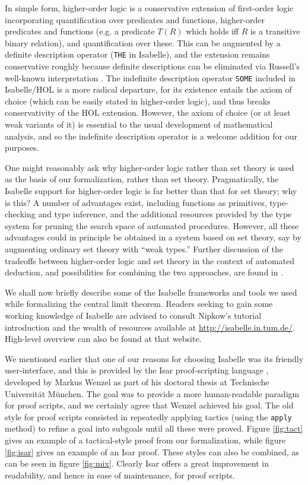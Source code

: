 \documentclass{article}
\theoremstyle{definition}
\begin{document}
In simple form, higher-order logic is a conservative extension of first-order logic incorporating quantification over predicates and functions, higher-order predicates and functions (e.g. a predicate $T(R)$ which holds iff $R$ is a transitive binary relation), and quantification over these. This can be augmented by a definite description operator (\texttt{THE} in Isabelle), and the extension remains conservative roughly because definite descriptions can be eliminated via Russell's well-known interpretation \cite{russell-knowledge-acquaintance-description}. The indefinite description operator \texttt{SOME} included in Isabelle/HOL is a more radical departure, for its existence entails the axiom of choice (which can be easily stated in higher-order logic), and thus breaks conservativity of the HOL extension. However, the axiom of choice (or at least weak variants of it) is essential to the usual development of mathematical analysis, and so the indefinite description operator is a welcome addition for our purposes.

One might reasonably ask why higher-order logic rather than set theory is used as the basis of our formalization, rather than set theory. Pragmatically, the Isabelle support for higher-order logic is far better than that for set theory; why is this? A number of advantages exist, including functions as primitives, type-checking and type inference, and the additional resources provided by the type system for pruning the search space of automated procedures. However, all these advantages could in principle be obtained in a system based on set theory, say by augmenting ordinary set theory with ``weak types.'' Further discussion of the tradeoffs between higher-order logic and set theory in the context of automated deduction, and possibilities for combining the two approaches, are found in \cite{gordon-hol-set}.

We shall now briefly describe some of the Isabelle frameworks and tools we used while formalizing the central limit theorem. Readers seeking to gain some working knowledge of Isabelle are advised to consult Nipkow's tutorial introduction \cite{nipkow-prog-prove} and the wealth of resources available at \url{http://isabelle.in.tum.de/}. High-level overview can also be found at that website.

We mentioned earlier that one of our reasons for choosing Isabelle was its friendly user-interface, and this is provided by the Isar proof-scripting language \cite{wenzel-isar}, developed by Markus Wenzel as part of his doctoral thesis at Technische Universit\"at M\"unchen. The goal was to provide a more human-readable paradigm for proof scripts, and we certainly agree that Wenzel achieved his goal. The old style for proof scripts consisted in repeatedly applying tactics (using the \texttt{apply} method) to refine a goal into subgoals until all these were proved. Figure \ref{fig:tact} gives an example of a tactical-style proof from our formalization, while figure \ref{fig:isar} gives an example of an Isar proof. These styles can also be combined, as can be seen in figure \ref{fig:mix}. Clearly Isar offers a great improvement in readability, and hence in ease of maintenance, for proof scripts.
\end{document}
